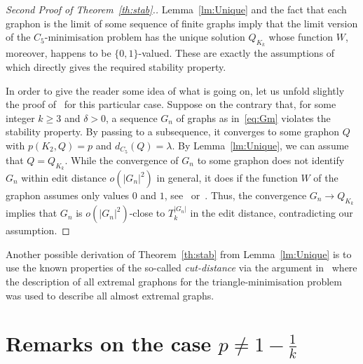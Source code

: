 \documentclass[12pt]{article}
\theoremstyle{definition}
\theoremstyle{remark}
\renewcommand{\ge}{\geqslant}
\begin{document}
\begin{proof}[Second Proof of Theorem~\ref{th:stab}.] Lemma~\ref{lm:Unique} and the fact that each graphon is the limit of some sequence of finite graphs imply that the limit version of the $C_5$-minimisation problem has the unique solution $Q_{K_k}$ whose function $W$, moreover, happens to be $\{0,1\}$-valued. These are exactly the assumptions of~\cite[Theorem~15]{Pikhurko10dm} which directly gives the required stability property.
	
	In order to give the reader some idea of what is going on, let us unfold slightly the proof of~\cite[Theorem~15]{Pikhurko10dm} for this particular case. Suppose on the contrary that, for some integer $k\ge 3$ and $\delta>0$, a sequence $G_n$ of graphs as in~\eqref{eq:Gm} violates the stability property. By passing to a subsequence, it converges to some graphon $Q$ with $p(K_2,Q)=p$ and $d_{C_5}(Q)=\lambda$.
	By Lemma~\ref{lm:Unique}, we can assume that $Q=Q_{K_k}$. While the convergence of $G_n$ to some graphon does not identify $G_n$ within edit distance $o(|G_n|^2)$ in general,
	it does if the function $W$ of the graphon assumes only values $0$ and $1$, see~\cite[Lemma~2.9]{LovaszSzegedy10ijm} or~\cite[Theorem~17]{Pikhurko10dm}. %
	Thus, the convergence $G_n\to Q_{K_k}$ implies that $G_n$ is $o(|G_n|^2)$-close to $T_k^{|G_n|}$ in the edit distance, contradicting our assumption.\end{proof}



Another possible derivation of Theorem~\ref{th:stab} from Lemma~\ref{lm:Unique}
is to use the known properties of the so-called \emph{cut-distance} via the argument in~\cite[Page 146]{PikRaz2017} where the description of all extremal graphons for the triangle-minimisation problem was used to describe all almost extremal graphs.




\section{Remarks on the case $p \neq 1-\frac{1}{k}$}\label{sec:general_case}
\end{document}
